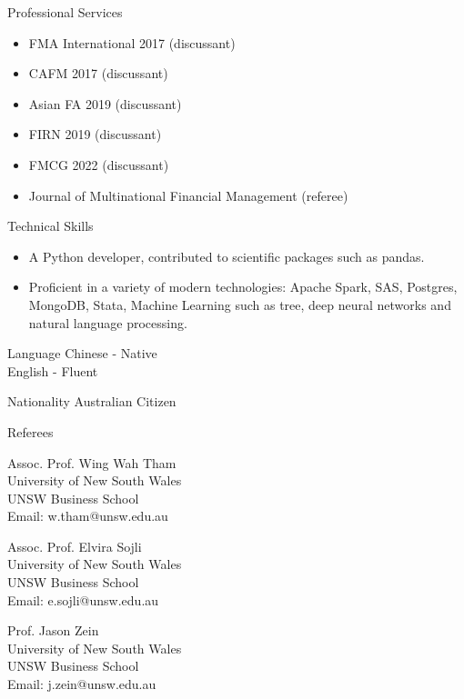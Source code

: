 \documentclass{resume} %
\begin{document}
\begin{rSection}{Professional Services}
	\begin{itemize}
		\item FMA International 2017 (discussant)
		\item CAFM 2017 (discussant)
		\item Asian FA 2019 (discussant)
		\item FIRN 2019 (discussant)
		\item FMCG 2022 (discussant)
    \item Journal of Multinational Financial Management (referee)
	\end{itemize}
\end{rSection}

\begin{rSection}{Technical Skills}
	\begin{itemize}
		\item A Python developer, contributed to scientific packages such as pandas.
		\item Proficient in a variety of modern technologies: Apache Spark, SAS, Postgres, MongoDB, Stata, Machine Learning such as tree, deep neural networks and natural language processing.
	\end{itemize}
\end{rSection}

\begin{rSection}{Language}
	Chinese - Native\\
	English - Fluent
\end{rSection}

\begin{rSection}{Nationality}
	Australian Citizen
\end{rSection}

\begin{rSection}{Referees} \itemsep -3pt
	\begin{multicols}{2}
		Assoc. Prof. Wing Wah Tham\\
		University of New South Wales\\
		UNSW Business School\\
		Email: w.tham@unsw.edu.au

		Assoc. Prof. Elvira Sojli\\
		University of New South Wales\\
		UNSW Business School\\
		Email: e.sojli@unsw.edu.au\\
		\columnbreak

		Prof. Jason Zein\\
		University of New South Wales\\
		UNSW Business School\\
		Email: j.zein@unsw.edu.au
	\end{multicols}

\end{rSection}
\end{document}
